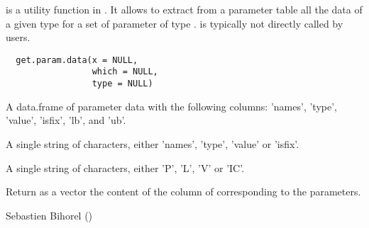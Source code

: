 %
\begin{Description}\relax
{} is a utility function in . It allows to 
extract from a parameter table  all the data of a given type
 for a set of parameter of type . 
is typically not directly called by users.
\end{Description}
%
\begin{Usage}
\begin{verbatim}
  get.param.data(x = NULL,
                 which = NULL,
                 type = NULL)
\end{verbatim}
\end{Usage}
%
\begin{Arguments}
\begin{ldescription}
\item[\code{x}] A data.frame of parameter data with the following columns: 'names', 
'type', 'value', 'isfix', 'lb', and 'ub'.
\item[\code{which}] A single string of characters, either 'names', 'type', 'value' or
'isfix'.
\item[\code{type}] A single string of characters, either 'P', 'L', 'V' or 'IC'.
\end{ldescription}
\end{Arguments}
%
\begin{Value}
Return as a vector the content of the  column of  
corresponding to the  parameters.
\end{Value}
%
\begin{Author}\relax
Sebastien Bihorel ()
\end{Author}
